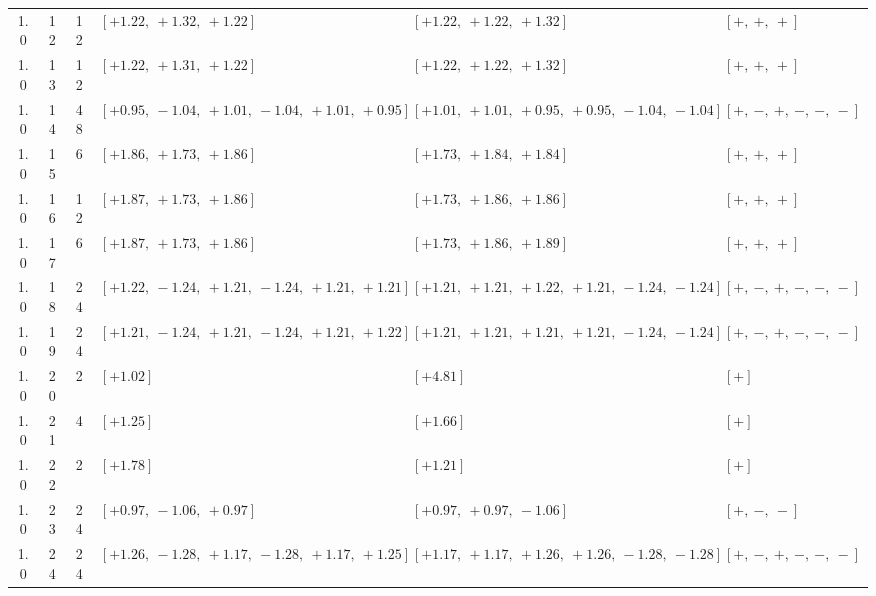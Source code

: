 \begin{landscape}
\begin{longtable}{@{}ccc >{\raggedright\arraybackslash}p{6.1cm} >{\raggedright\arraybackslash}p{6.1cm} >{\raggedright\arraybackslash}p{4.2cm}@{}}
1.0 & 12 & 12 & \([+1.22,\allowbreak\ +1.32,\allowbreak\ +1.22]\) & \([+1.22,\allowbreak\ +1.22,\allowbreak\ +1.32]\) & \([+,\allowbreak\ +,\allowbreak\ +]\) \\
1.0 & 13 & 12 & \([+1.22,\allowbreak\ +1.31,\allowbreak\ +1.22]\) & \([+1.22,\allowbreak\ +1.22,\allowbreak\ +1.32]\) & \([+,\allowbreak\ +,\allowbreak\ +]\) \\
1.0 & 14 & 48 & \([+0.95,\allowbreak\ -1.04,\allowbreak\ +1.01,\allowbreak\ -1.04,\allowbreak\ +1.01,\allowbreak\ +0.95]\) & \([+1.01,\allowbreak\ +1.01,\allowbreak\ +0.95,\allowbreak\ +0.95,\allowbreak\ -1.04,\allowbreak\ -1.04]\) & \([+,\allowbreak\ -,\allowbreak\ +,\allowbreak\ -,\allowbreak\ -,\allowbreak\ -]\) \\
1.0 & 15 & 6 & \([+1.86,\allowbreak\ +1.73,\allowbreak\ +1.86]\) & \([+1.73,\allowbreak\ +1.84,\allowbreak\ +1.84]\) & \([+,\allowbreak\ +,\allowbreak\ +]\) \\
1.0 & 16 & 12 & \([+1.87,\allowbreak\ +1.73,\allowbreak\ +1.86]\) & \([+1.73,\allowbreak\ +1.86,\allowbreak\ +1.86]\) & \([+,\allowbreak\ +,\allowbreak\ +]\) \\
1.0 & 17 & 6 & \([+1.87,\allowbreak\ +1.73,\allowbreak\ +1.86]\) & \([+1.73,\allowbreak\ +1.86,\allowbreak\ +1.89]\) & \([+,\allowbreak\ +,\allowbreak\ +]\) \\
1.0 & 18 & 24 & \([+1.22,\allowbreak\ -1.24,\allowbreak\ +1.21,\allowbreak\ -1.24,\allowbreak\ +1.21,\allowbreak\ +1.21]\) & \([+1.21,\allowbreak\ +1.21,\allowbreak\ +1.22,\allowbreak\ +1.21,\allowbreak\ -1.24,\allowbreak\ -1.24]\) & \([+,\allowbreak\ -,\allowbreak\ +,\allowbreak\ -,\allowbreak\ -,\allowbreak\ -]\) \\
1.0 & 19 & 24 & \([+1.21,\allowbreak\ -1.24,\allowbreak\ +1.21,\allowbreak\ -1.24,\allowbreak\ +1.21,\allowbreak\ +1.22]\) & \([+1.21,\allowbreak\ +1.21,\allowbreak\ +1.21,\allowbreak\ +1.21,\allowbreak\ -1.24,\allowbreak\ -1.24]\) & \([+,\allowbreak\ -,\allowbreak\ +,\allowbreak\ -,\allowbreak\ -,\allowbreak\ -]\) \\
1.0 & 20 & 2 & \([+1.02]\) & \([+4.81]\) & \([+]\) \\
1.0 & 21 & 4 & \([+1.25]\) & \([+1.66]\) & \([+]\) \\
1.0 & 22 & 2 & \([+1.78]\) & \([+1.21]\) & \([+]\) \\
1.0 & 23 & 24 & \([+0.97,\allowbreak\ -1.06,\allowbreak\ +0.97]\) & \([+0.97,\allowbreak\ +0.97,\allowbreak\ -1.06]\) & \([+,\allowbreak\ -,\allowbreak\ -]\) \\
1.0 & 24 & 24 & \([+1.26,\allowbreak\ -1.28,\allowbreak\ +1.17,\allowbreak\ -1.28,\allowbreak\ +1.17,\allowbreak\ +1.25]\) & \([+1.17,\allowbreak\ +1.17,\allowbreak\ +1.26,\allowbreak\ +1.26,\allowbreak\ -1.28,\allowbreak\ -1.28]\) & \([+,\allowbreak\ -,\allowbreak\ +,\allowbreak\ -,\allowbreak\ -,\allowbreak\ -]\) \\

\end{longtable}
\end{landscape}
